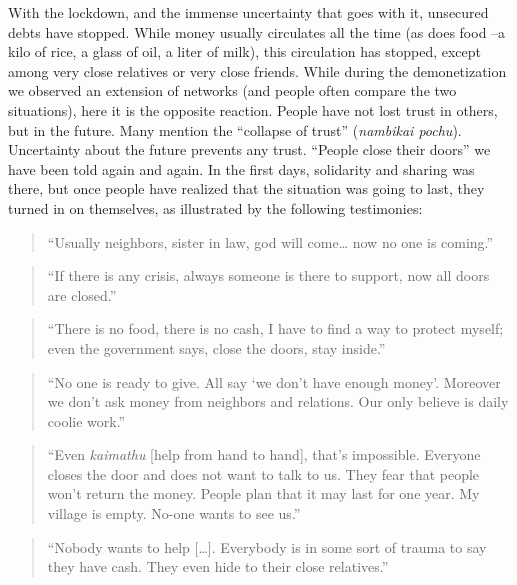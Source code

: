 \documentclass[a4paper, 11pt, onecolumn]{article}
\begin{document}
With the lockdown, and the immense uncertainty that goes with it, unsecured debts have stopped. 
While money usually circulates all the time (as does food --a kilo of rice, a glass of oil, a liter of milk), this circulation has stopped, except among very close relatives or very close friends. 
While during the demonetization we observed an extension of networks (and people often compare the two situations), here it is the opposite reaction. 
People have not lost trust in others, but in the future. 
Many mention the ``collapse of trust'' (\textit{nambikai pochu}). 
Uncertainty about the future prevents any trust. 
``People close their doors'' we have been told again and again. 
In the first days, solidarity and sharing was there, but once people have realized that the situation was going to last, they turned in on themselves, as illustrated by the following testimonies:
\begin{quote} 
``Usually neighbors, sister in law, god will come… now no one is coming.''
\end{quote}
\begin{quote}
``If there is any crisis, always someone is there to support, now all doors are closed.'' 
\end{quote}
\begin{quote}
``There is no food, there is no cash, I have to find a way to protect myself; even the government says, close the doors, stay inside.'' 
\end{quote}
\begin{quote}
``No one is ready to give. 
All say ‘we don’t have enough money’. 
Moreover we don’t ask money from neighbors and relations. 
Our only believe is daily coolie work.''
\end{quote}
\begin{quote}
``Even \textit{kaimathu} [help from hand to hand], that's impossible. 
Everyone closes the door and does not want to talk to us. 
They fear that people won't return the money. 
People plan that it may last for one year. 
My village is empty. 
No-one wants to see us.''
\end{quote}
\begin{quote}
``Nobody wants to help […].
Everybody is in some sort of trauma to say they have cash. 
They even hide to their close relatives.'' 
\end{quote}
\end{document}
